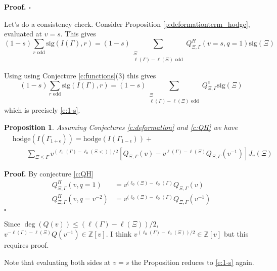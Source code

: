 \documentclass[12pt,leqno]{article}
\newtheorem{proposition}[equation]{Proposition}
\newcommand{\qed}{\hfill $\square$ \medskip}
\newenvironment{proof}[1][Proof]{\noindent\textbf{#1.} }{\qed}
\newcommand{\sig}{\text{sig}}
\newcommand{\hodge}{\text{hodge}}
\newcommand{\Z}{\mathbb Z}
\newcommand\inv{^{-1}}
\begin{document}
\begin{proof}
\end{proof}

Let's do a consistency check. Consider
Proposition \ref{p:deformationterm_hodge}, evaluated at $v=s$. This gives
$$
(1-s)\sum_{r\text{ odd}}\sig(I(\Gamma),r)=
(1-s)\sum_{\substack{\Xi\\\ell(\Gamma)-\ell(\Xi)\text{ odd}}}Q^H_{\Xi,\Gamma}(v=s,q=1)\sig(\Xi)
$$

Using  using Conjecture \ref{c:functions}(3) this gives
$$
(1-s)\sum_{r\text{ odd}}\sig(I(\Gamma),r)=
(1-s)\sum_{\substack{\Xi\\\ell(\Gamma)-\ell(\Xi)\text{ odd}}}Q^c_{\Xi,\Gamma}\sig(\Xi)
$$
which is precisely \eqref{e:1-s}.


\begin{proposition}
\label{p:deformationterm_hodge2}
Assuming Conjectures \ref{c:deformation} and \ref{c:QH} we have
\normalfont
$$
\begin{aligned}
&\hodge(I(\Gamma_{1+\epsilon}))=\hodge(I(\Gamma_{1-\epsilon}))+\\
&\qquad \sum_{\Xi\le\Gamma}v^{(\ell_0(\Gamma)-\ell_0(\Xi<))/2}[Q_{\Xi,\Gamma}(v)-v^{\ell(\Gamma)-\ell(\Xi)}Q_{\Xi,\Gamma}(v\inv)]J_v(\Xi)
\end{aligned}
$$
\end{proposition}

\begin{proof}
By conjecture \ref{c:QH}
$$
\begin{aligned}
Q^H_{\Xi,\Gamma}(v,q=1)&=v^{(\ell_0(\Xi)-\ell_0(\Gamma)}Q_{\Xi,\Gamma}(v)\\
Q^H_{\Xi,\Gamma}(v,q=v^{-2})&=v^{(\ell_0(\Xi)-\ell_0(\Gamma)}Q_{\Xi,\Gamma}(v\inv)\\
\end{aligned}
$$
\end{proof}


\begin{remarkplain}
Since $\deg(Q(v))\le (\ell(\Gamma)-\ell(\Xi))/2$, $v^{-\ell(\Gamma)-\ell(\Xi)}Q(v\inv)\in \Z[v]$.
I think $v^{(\ell_0(\Gamma)-\ell_0(\Xi))/2}\in\Z[v]$ but this requires proof.
\end{remarkplain}

Note that evaluating both sides at $v=s$ the Proposition reduces to  \eqref{e:1-s} again.


\end{document}
